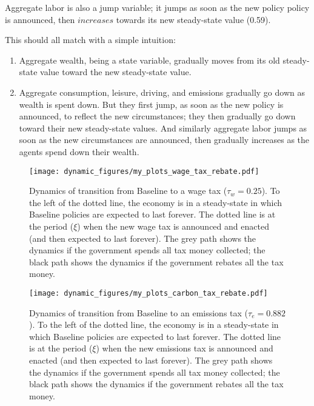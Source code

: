 \documentclass[letter, 12pt, epsf,leqno]{article}
\begin{document}
Aggregate labor is also a jump variable; it jumps as soon as the new policy policy is announced, then $increases$ towards its new steady-state value (0.59).\par

This should all match with a simple intuition:  
\begin{enumerate}
\item Aggregate wealth, being a state variable, gradually moves from its old steady-state value toward the new steady-state value.

\item  Aggregate consumption, leisure, driving, and emissions gradually go down as wealth is spent down.  But they first jump, as soon as the new policy is announced, to reflect the new circumstances; they then gradually go down toward their new steady-state values.  And similarly aggregate labor jumps as soon as the new circumstances are announced, then gradually increases as the agents spend down their wealth.
\end{enumerate}








\begin{figure}[H]
\centering
\texttt{[image: dynamic\_figures/my\_plots\_wage\_tax\_rebate.pdf]}
\caption{Dynamics of transition from Baseline to a wage tax ($\tau_w=0.25$).  To the left of the dotted line, the economy is in a steady-state in which Baseline policies are expected to last forever.  The dotted line is at the period ($\xi$) when the new wage tax is announced and enacted (and then expected to last forever).  The grey path shows the dynamics if the government spends all tax money collected; the black path shows the dynamics if the government rebates all the tax money.}
\label{figure:wage_tax_dyn}
\end{figure}

\begin{figure}[H]
\centering
\texttt{[image: dynamic\_figures/my\_plots\_carbon\_tax\_rebate.pdf]}
\caption{Dynamics of transition from Baseline to an emissions tax ($\tau_e=0.882$).  To the left of the dotted line, the economy is in a steady-state in which Baseline policies are expected to last forever.  The dotted line is at the period ($\xi$) when the new emissions tax is announced and enacted (and then expected to last forever).  The grey path shows the dynamics if the government spends all tax money collected; the black path shows the dynamics if the government rebates all the tax money.}
\label{figure:emissions_tax_dyn}
\end{figure}
\end{document}
